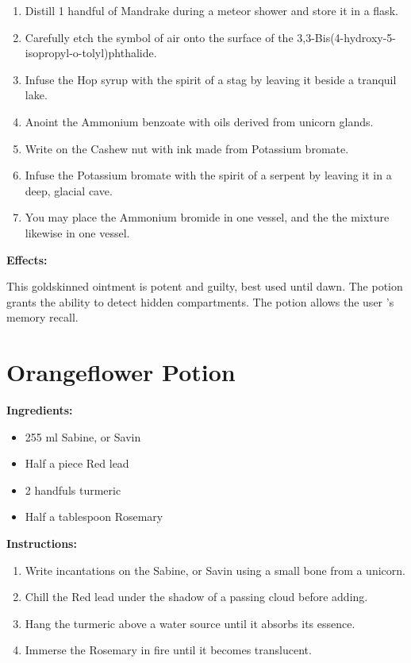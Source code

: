 \documentclass{article}
\begin{document}
\begin{enumerate}
  \item Distill 1 handful of Mandrake during a meteor shower and store it in a flask.
  \item Carefully etch the symbol of air onto the surface of the 3,3-Bis(4-hydroxy-5-isopropyl-o-tolyl)phthalide.
  \item Infuse the Hop syrup with the spirit of a stag by leaving it beside a tranquil lake.
  \item Anoint the Ammonium benzoate with oils derived from unicorn glands.
  \item Write on the Cashew nut with ink made from Potassium bromate.
  \item Infuse the Potassium bromate with the spirit of a serpent by leaving it in a deep, glacial cave.
  \item You may place the Ammonium bromide in one vessel, and the the mixture likewise in one vessel.
\end{enumerate}

\textbf{Effects:}

This goldskinned ointment is potent and guilty, best used until dawn. The potion grants the ability to detect hidden compartments. The potion allows the user 's memory recall.

\newpage
\section*{Orangeflower Potion}

\textbf{Ingredients:}

\begin{itemize}
  \item 255 ml Sabine, or Savin
  \item Half a piece Red lead
  \item 2 handfuls turmeric
  \item Half a tablespoon Rosemary
\end{itemize}

\textbf{Instructions:}

\begin{enumerate}
  \item Write incantations on the Sabine, or Savin using a small bone from a unicorn.
  \item Chill the Red lead under the shadow of a passing cloud before adding.
  \item Hang the turmeric above a water source until it absorbs its essence.
  \item Immerse the Rosemary in fire until it becomes translucent.
\end{enumerate}
\end{document}
